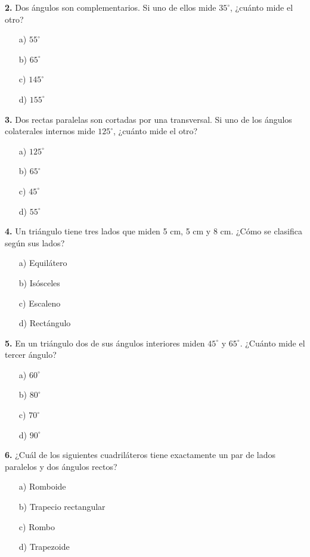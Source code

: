 \noindent\textbf{2.} Dos ángulos son complementarios. Si uno de ellos mide $35^\circ$, ¿cuánto mide el otro?

\begin{itemize}
    \item[a)] $55^\circ$
    \item[b)] $65^\circ$
    \item[c)] $145^\circ$
    \item[d)] $155^\circ$
\end{itemize}


\noindent\textbf{3.} Dos rectas paralelas son cortadas por una transversal. Si uno de los ángulos colaterales internos mide $125^\circ$, ¿cuánto mide el otro?

\begin{itemize}
    \item[a)] $125^\circ$
    \item[b)] $65^\circ$
    \item[c)] $45^\circ$
    \item[d)] $55^\circ$
\end{itemize}


\noindent\textbf{4.} Un triángulo tiene tres lados que miden 5 cm, 5 cm y 8 cm. ¿Cómo se clasifica según sus lados?

\begin{itemize}
    \item[a)] Equilátero
    \item[b)] Isósceles
    \item[c)] Escaleno
    \item[d)] Rectángulo
\end{itemize}


\noindent\textbf{5.} En un triángulo dos de sus ángulos interiores miden $45^\circ$ y $65^\circ$. ¿Cuánto mide el tercer ángulo?

\begin{itemize}
    \item[a)] $60^\circ$
    \item[b)] $80^\circ$
    \item[c)] $70^\circ$
    \item[d)] $90^\circ$
\end{itemize}


\noindent\textbf{6.} ¿Cuál de los siguientes cuadriláteros tiene exactamente un par de lados paralelos y dos ángulos rectos?

\begin{itemize}
    \item[a)] Romboide
    \item[b)] Trapecio rectangular
    \item[c)] Rombo
    \item[d)] Trapezoide
\end{itemize}


